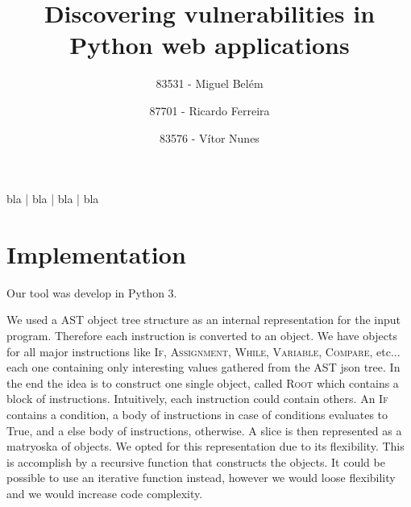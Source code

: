 \documentclass[times, twoside, watermark]{zHenriquesLab-StyleBioRxiv}
\begin{document}
\title{Discovering vulnerabilities in Python web applications}

\author[1,\Letter]{83531 - Miguel Belém}
\author[2,\Letter]{87701 - Ricardo Ferreira}
\author[3,\Letter]{83576 - Vítor Nunes}

\maketitle

\begin{abstract}
\blindtext
\end {abstract}

\begin{keywords}
bla | bla | bla | bla
\end{keywords}

\begin{corrauthor}

\end{corrauthor}

\section*{Implementation}
Our tool was develop in Python 3.

We used a AST object tree structure as an internal representation for the input program. Therefore
each instruction is converted to an object. We have objects for all major instructions like \textsc{If},
\textsc{Assignment}, \textsc{While}, \textsc{Variable}, \textsc{Compare}, etc... each one containing
only interesting values gathered from the AST json tree.
In the end the idea is to construct one single object, called \textsc{Root} which contains a block of instructions.
Intuitively, each instruction could contain others. An \textsc{If} contains a condition, a body of instructions
in case of conditions evaluates to True, and a else body of instructions, otherwise. A slice is then represented
as a matryoska of objects. We opted for this representation due to its flexibility. This is
accomplish by a recursive function that constructs the objects. It could be possible to use an iterative
function instead, however we would loose flexibility and we would increase code complexity.
\end{document}
